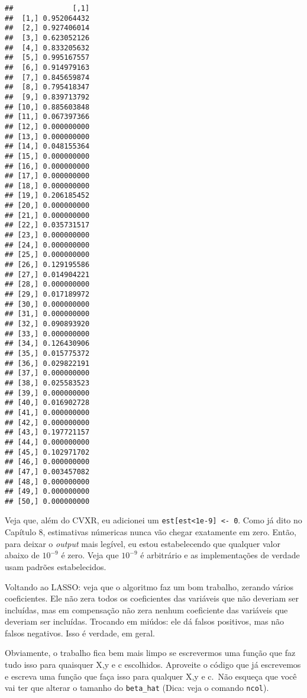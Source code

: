 \documentclass[
]{book}
\begin{document}
\begin{verbatim}
##              [,1]
##  [1,] 0.952064432
##  [2,] 0.927406014
##  [3,] 0.623052126
##  [4,] 0.833205632
##  [5,] 0.995167557
##  [6,] 0.914979163
##  [7,] 0.845659874
##  [8,] 0.795418347
##  [9,] 0.839713792
## [10,] 0.885603848
## [11,] 0.067397366
## [12,] 0.000000000
## [13,] 0.000000000
## [14,] 0.048155364
## [15,] 0.000000000
## [16,] 0.000000000
## [17,] 0.000000000
## [18,] 0.000000000
## [19,] 0.206185452
## [20,] 0.000000000
## [21,] 0.000000000
## [22,] 0.035731517
## [23,] 0.000000000
## [24,] 0.000000000
## [25,] 0.000000000
## [26,] 0.129195586
## [27,] 0.014904221
## [28,] 0.000000000
## [29,] 0.017189972
## [30,] 0.000000000
## [31,] 0.000000000
## [32,] 0.090893920
## [33,] 0.000000000
## [34,] 0.126430906
## [35,] 0.015775372
## [36,] 0.029822191
## [37,] 0.000000000
## [38,] 0.025583523
## [39,] 0.000000000
## [40,] 0.016902728
## [41,] 0.000000000
## [42,] 0.000000000
## [43,] 0.197721157
## [44,] 0.000000000
## [45,] 0.102971702
## [46,] 0.000000000
## [47,] 0.003457082
## [48,] 0.000000000
## [49,] 0.000000000
## [50,] 0.000000000
\end{verbatim}

Veja que, além do CVXR, eu adicionei um \texttt{est{[}est\textless{}1e-9{]}\ \textless{}-\ 0}. Como já dito no Capítulo 8, estimativas númericas nunca vão chegar exatamente em zero. Então, para deixar o \emph{output} mais legível, eu estou estabelecendo que qualquer valor abaixo de \(10^{-9}\) é zero. Veja que \(10^{-9}\) é arbitrário e as implementações de verdade usam padrões estabelecidos.

Voltando ao LASSO: veja que o algoritmo faz um bom trabalho, zerando vários coeficientes. Ele não zera todos os coeficientes das variáveis que não deveriam ser incluídas, mas em compensação não zera nenhum coeficiente das variáveis que deveriam ser incluídas. Trocando em miúdos: ele dá falsos positivos, mas não falsos negativos. Isso é verdade, em geral.

Obviamente, o trabalho fica bem mais limpo se escrevermos uma função que faz tudo isso para quaisquer X,y e c escolhidos. Aproveite o código que já escrevemos e escreva uma função que faça isso para qualquer X,y e c.~Não esqueça que você vai ter que alterar o tamanho do \texttt{beta\_hat} (Dica: veja o comando \texttt{ncol}).
\end{document}
